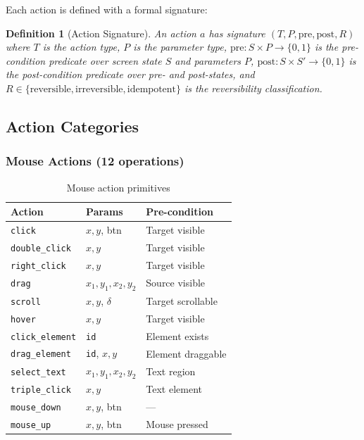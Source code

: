 \documentclass[11pt,twocolumn]{article}
\newtheorem{definition}{Definition}
\begin{document}
Each action is defined with a formal signature:

\begin{definition}[Action Signature]
An action $a$ has signature $(T, P, \text{pre}, \text{post}, R)$ where $T$ is the action type, $P$ is the parameter type, $\text{pre}: S \times P \rightarrow \{0,1\}$ is the pre-condition predicate over screen state $S$ and parameters $P$, $\text{post}: S \times S' \rightarrow \{0,1\}$ is the post-condition predicate over pre- and post-states, and $R \in \{\text{reversible}, \text{irreversible}, \text{idempotent}\}$ is the reversibility classification.
\end{definition}

\subsection{Action Categories}

\subsubsection{Mouse Actions (12 operations)}

\begin{table}[t]
\centering
\caption{Mouse action primitives}
\label{tab:mouse}
\begin{tabular}{@{}llp{2.8cm}@{}}
\toprule
\textbf{Action} & \textbf{Params} & \textbf{Pre-condition} \\
\midrule
\texttt{click} & $x, y$, btn & Target visible \\
\texttt{double\_click} & $x, y$ & Target visible \\
\texttt{right\_click} & $x, y$ & Target visible \\
\texttt{drag} & $x_1, y_1, x_2, y_2$ & Source visible \\
\texttt{scroll} & $x, y$, $\delta$ & Target scrollable \\
\texttt{hover} & $x, y$ & Target visible \\
\texttt{click\_element} & \texttt{id} & Element exists \\
\texttt{drag\_element} & \texttt{id}, $x, y$ & Element draggable \\
\texttt{select\_text} & $x_1, y_1, x_2, y_2$ & Text region \\
\texttt{triple\_click} & $x, y$ & Text element \\
\texttt{mouse\_down} & $x, y$, btn & --- \\
\texttt{mouse\_up} & $x, y$, btn & Mouse pressed \\
\bottomrule
\end{tabular}
\end{table}
\end{document}
